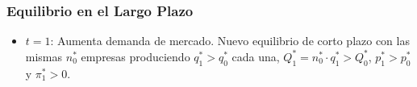 \documentclass[dvipsnames,table,leqno]{beamer}
\newcommand{\peq}[1]{{\scriptscriptstyle{#1}}}
\begin{document}
\begin{frame}
\begin{figure}[hbtp!]
\begin{subfigure}[b]{0.49\textwidth}
				\end{subfigure}
			\end{figure}
		\end{frame}

		\begin{frame}
			\frametitle{Equilibrio en el Largo Plazo}
				\begin{itemize}
					\item $t=1$: Aumenta demanda de mercado. Nuevo equilibrio de corto plazo con las mismas $n^\peq{*}_\peq{0}$ empresas produciendo $q^\peq{*}_\peq{1}>q^\peq{*}_\peq{0}$ cada una, $Q^\peq{*}_\peq{1}=n^\peq{*}_\peq{0}\cdot q^\peq{*}_\peq{1}>Q^\peq{*}_\peq{0}$, $p^\peq{*}_\peq{1}>p^\peq{*}_\peq{0}$ y $\pi^\peq{*}_\peq{1}>0$.
				\end{itemize}
		\end{frame}
\end{document}
